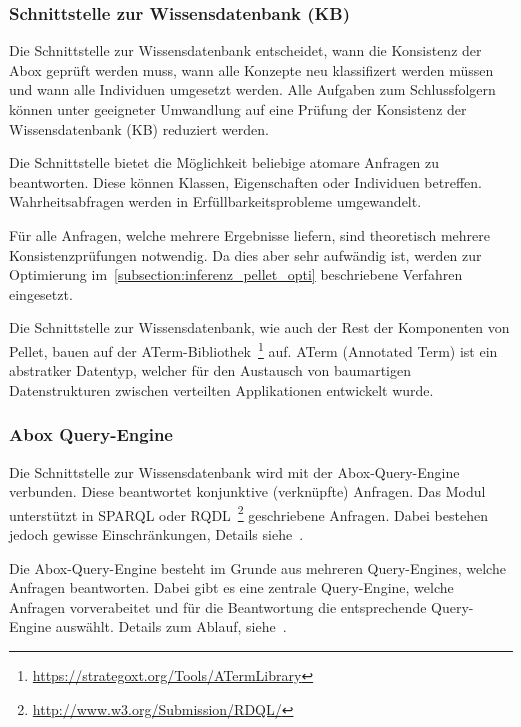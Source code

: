 \subsubsection{Schnittstelle zur Wissensdatenbank (KB)}
\label{ssubsection:inferenz_pellet_kb}
Die Schnittstelle zur Wissensdatenbank entscheidet, wann die Konsistenz der Abox geprüft werden muss, wann alle Konzepte neu klassifizert werden müssen und wann alle Individuen umgesetzt werden. Alle Aufgaben zum Schlussfolgern können unter geeigneter Umwandlung auf eine Prüfung der Konsistenz der Wissensdatenbank (KB) reduziert werden.

Die Schnittstelle bietet die Möglichkeit beliebige atomare Anfragen zu beantworten. Diese können Klassen, Eigenschaften oder Individuen betreffen. Wahrheitsabfragen werden in Erfüllbarkeitsprobleme umgewandelt.

Für alle Anfragen, welche mehrere Ergebnisse liefern, sind theoretisch mehrere Konsistenzprüfungen notwendig. Da dies aber sehr aufwändig ist, werden zur Optimierung im~\autoref{subsection:inferenz_pellet_opti} beschriebene Verfahren eingesetzt.

Die Schnittstelle zur Wissensdatenbank, wie auch der Rest der Komponenten von Pellet, bauen auf der ATerm-Bibliothek~\footnote{\url{https://strategoxt.org/Tools/ATermLibrary}} auf. ATerm (Annotated Term) ist ein abstratker Datentyp, welcher für den Austausch von baumartigen Datenstrukturen zwischen verteilten Applikationen entwickelt wurde.

\subsubsection{Abox Query-Engine}
\label{ssubsection:inferenz_pellet_aboxquery}
Die Schnittstelle zur Wissensdatenbank wird mit der Abox-Query-Engine verbunden. Diese beantwortet konjunktive (verknüpfte) Anfragen. Das Modul unterstützt in SPARQL oder RQDL~\footnote{\url{http://www.w3.org/Submission/RDQL/}} geschriebene Anfragen. Dabei bestehen jedoch gewisse Einschränkungen, Details siehe~\cite[S. 10 - 11]{sirin:pellet05}.

Die Abox-Query-Engine besteht im Grunde aus mehreren Query-Engines, welche Anfragen beantworten. Dabei gibt es eine zentrale Query-Engine, welche Anfragen vorverabeitet und für die Beantwortung die entsprechende Query-Engine auswählt. Details zum Ablauf, siehe~\cite[S. 11]{sirin:pellet05}.

